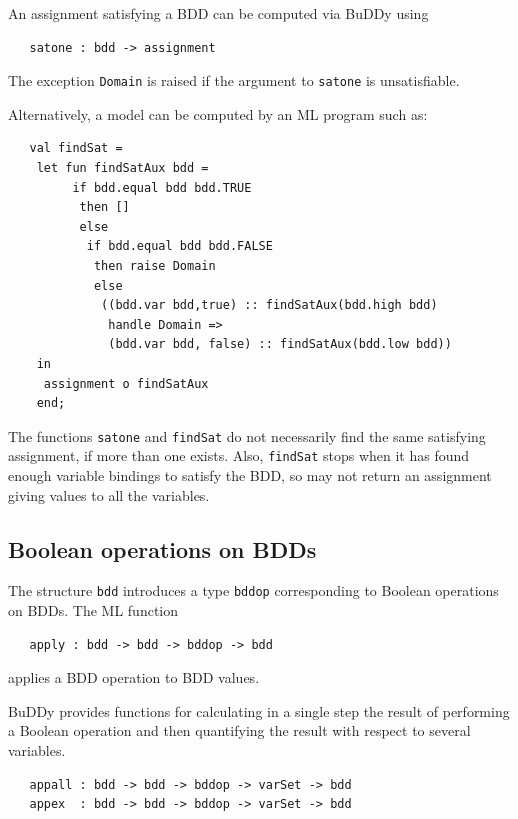 \documentclass[12pt,fleqn]{article}
\renewcommand{\t}[1]{\mbox{\tt #1}}
\newcommand{\Buddy}{BuDDy{}}
\begin{document}
An assignment satisfying a BDD can be computed via \Buddy{} using

\begin{verbatim}
   satone : bdd -> assignment
\end{verbatim}

The exception \t{Domain} is raised if the argument to \t{satone} is unsatisfiable.

Alternatively, a model can be computed by an ML program such as:

\begin{verbatim}
   val findSat =
    let fun findSatAux bdd =
         if bdd.equal bdd bdd.TRUE
          then []
          else
           if bdd.equal bdd bdd.FALSE
            then raise Domain
            else
             ((bdd.var bdd,true) :: findSatAux(bdd.high bdd)
              handle Domain =>
              (bdd.var bdd, false) :: findSatAux(bdd.low bdd))
    in
     assignment o findSatAux
    end;
\end{verbatim}

The functions \t{satone} and \t{findSat} do not necessarily find the
same satisfying assignment, if more than one exists. Also,
\t{findSat} stops when it has found enough variable bindings to
satisfy the BDD, so may not return an assignment giving values to all
the variables.

\subsection{Boolean operations on BDDs}\label{app}

The structure \t{bdd} introduces a type \t{bddop}
corresponding to Boolean operations on BDDs.
The ML function

\begin{verbatim}
   apply : bdd -> bdd -> bddop -> bdd
\end{verbatim}

applies a BDD operation to BDD values.

\Buddy{} provides functions for calculating in a single step the
result of performing a Boolean operation and then quantifying the
result with respect to several variables.

\begin{verbatim}
   appall : bdd -> bdd -> bddop -> varSet -> bdd
   appex  : bdd -> bdd -> bddop -> varSet -> bdd
\end{verbatim}
\end{document}
